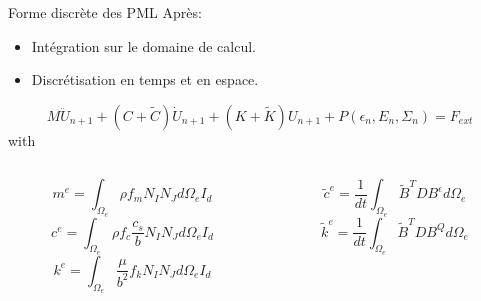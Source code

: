 \begin{frame}{Forme discrète des PML}
Après:
\begin{itemize}
\item Intégration sur le domaine de calcul.
\item Discrétisation en temps et en espace.
\end{itemize}
\begin{equation}
M \ddot{U}_{n+1} + (C+\tilde{C})\dot{U}_{n+1} + (K+\tilde{K})U_{n+1} + P(\epsilon_n, E_n, \Sigma_n) = F_{ext}
\end{equation}
with
\begin{columns}[T] %
\begin{column}{.48\textwidth}
\begin{equation*}
m^{e} = \int_{\Omega_e} \rho f_m N_I N_J d\Omega_e I_d
\end{equation*}
\begin{equation*}
 c^{e} = \int_{\Omega_e} \rho f_c \frac{c_s}{b} N_I N_J d\Omega_e I_d
\end{equation*}
\begin{equation*}
  k^{e} = \int_{\Omega_e} \frac{\mu}{b^2} f_k N_I N_J d\Omega_e I_d 
\end{equation*}
\end{column}%
\hfill%
\begin{column}{.48\textwidth}
\begin{equation*}
\tilde{c}^{e} = \frac{1}{dt} \int_{\Omega_e} \tilde{B}^T D B^\epsilon d\Omega_e
\end{equation*}
\begin{equation*}
\tilde{k}^{e} = \frac{1}{dt} \int_{\Omega_e} \tilde{B}^T D B^Q d\Omega_e
\end{equation*}

\end{column}%
\end{columns}

\end{frame}


